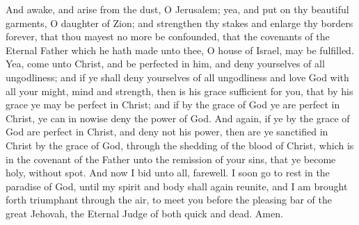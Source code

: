 And awake, and arise from the dust, O Jerusalem; yea, and put on thy beautiful garments, O daughter of Zion; and strengthen thy stakes and enlarge thy borders forever, that thou mayest no more be confounded, that the covenants of the Eternal Father which he hath made unto thee, O house of Israel, may be fulfilled.
\bverse \iffalse Yea, come unto Christ, and be perfected in him, and deny yourselves of all ungodliness; and if ye shall deny yourselves of all ungodliness and love God with all your might, mind and strength, then is his grace sufficient for you, that by his grace ye may be perfect in Christ; and if by the grace of God ye are perfect in Christ, ye can in nowise deny the power of God. \fi
Yea, come unto Christ, and be perfected in him, and deny yourselves of all ungodliness; and if ye shall deny yourselves of all ungodliness and love God with all your might, mind and strength, then is his grace sufficient for you, that by his grace ye may be perfect in Christ; and if by the grace of God ye are perfect in Christ, ye can in nowise deny the power of God.
\bverse \iffalse And again, if ye by the grace of God are perfect in Christ, and deny not his power, then are ye sanctified in Christ by the grace of God, through the shedding of the blood of Christ, which is in the covenant of the Father unto the remission of your sins, that ye become holy, without spot. \fi
And again, if ye by the grace of God are perfect in Christ, and deny not his power, then are ye sanctified in Christ by the grace of God, through the shedding of the blood of Christ, which is in the covenant of the Father unto the remission of your sins, that ye become holy, without spot.
\bverse \iffalse And now I bid unto all, farewell. I soon go to rest in the paradise of God, until my spirit and body shall again reunite, and I am brought forth triumphant through the air, to meet you before the pleasing bar of the great Jehovah, the Eternal Judge of both quick and dead. Amen. \fi
And now I bid unto all, farewell. I soon go to rest in the paradise of God, until my spirit and body shall again reunite, and I am brought forth triumphant through the air, to meet you before the pleasing bar of the great Jehovah, the Eternal Judge of both quick and dead. Amen.
